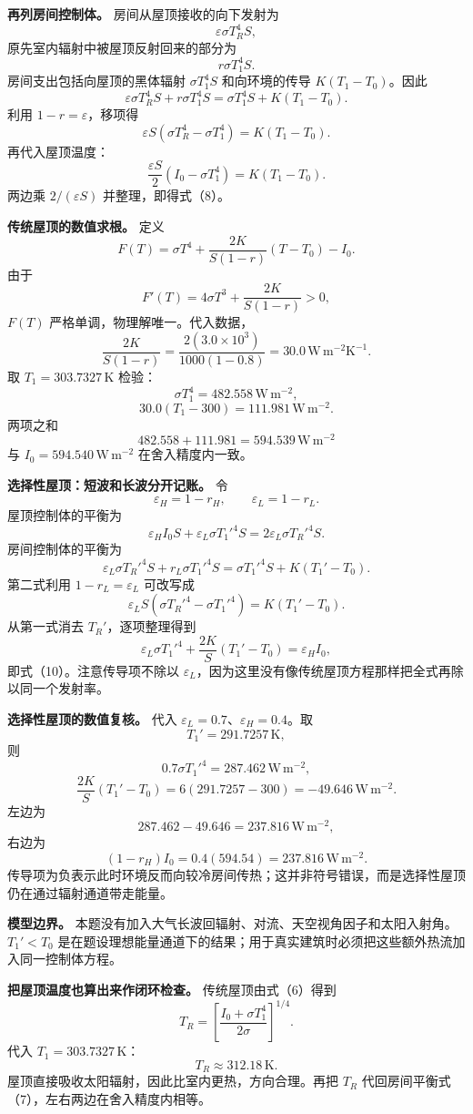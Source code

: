 \documentclass[12pt,a4paper,UTF8]{ctexart}
\begin{document}
\textbf{再列房间控制体。} 房间从屋顶接收的向下发射为 \[
\varepsilon\sigma T_R^4S,
\] 原先室内辐射中被屋顶反射回来的部分为 \[
r\sigma T_1^4S.
\] 房间支出包括向屋顶的黑体辐射 \(\sigma T_1^4S\) 和向环境的传导
\(K(T_1-T_0)\)。因此 \[
\varepsilon\sigma T_R^4S
+r\sigma T_1^4S
=\sigma T_1^4S+K(T_1-T_0).
\] 利用 \(1-r=\varepsilon\)，移项得 \[
\varepsilon S\left(\sigma T_R^4-\sigma T_1^4\right)
=K(T_1-T_0).
\] 再代入屋顶温度： \[
\frac{\varepsilon S}{2}
\left(I_0-\sigma T_1^4\right)
=K(T_1-T_0).
\] 两边乘 \(2/(\varepsilon S)\) 并整理，即得式（8）。

\textbf{传统屋顶的数值求根。} 定义 \[
F(T)=\sigma T^4+
\frac{2K}{S(1-r)}(T-T_0)-I_0.
\] 由于 \[
F'(T)=4\sigma T^3+\frac{2K}{S(1-r)}>0,
\] \(F(T)\) 严格单调，物理解唯一。代入数据， \[
\frac{2K}{S(1-r)}
=\frac{2(3.0\times10^3)}
{1000(1-0.8)}
=30.0\,\mathrm{W\,m^{-2}K^{-1}}.
\] 取 \(T_1=303.7327\,\mathrm K\) 检验： \[
\sigma T_1^4=482.558\,\mathrm{W\,m^{-2}},
\] \[
30.0(T_1-300)
=111.981\,\mathrm{W\,m^{-2}}.
\] 两项之和 \[
482.558+111.981
=594.539\,\mathrm{W\,m^{-2}}
\] 与 \(I_0=594.540\,\mathrm{W\,m^{-2}}\) 在舍入精度内一致。

\textbf{选择性屋顶：短波和长波分开记账。} 令 \[
\varepsilon_H=1-r_H,\qquad
\varepsilon_L=1-r_L.
\] 屋顶控制体的平衡为 \[
\varepsilon_HI_0S
+\varepsilon_L\sigma T_1'^4S
=2\varepsilon_L\sigma T_R'^4S.
\] 房间控制体的平衡为 \[
\varepsilon_L\sigma T_R'^4S
+r_L\sigma T_1'^4S
=\sigma T_1'^4S+K(T_1'-T_0).
\] 第二式利用 \(1-r_L=\varepsilon_L\) 可改写成 \[
\varepsilon_LS
\left(\sigma T_R'^4-\sigma T_1'^4\right)
=K(T_1'-T_0).
\] 从第一式消去 \(T_R'\)，逐项整理得到 \[
\varepsilon_L\sigma T_1'^4
+\frac{2K}{S}(T_1'-T_0)
=\varepsilon_HI_0,
\] 即式（10）。注意传导项不除以
\(\varepsilon_L\)，因为这里没有像传统屋顶方程那样把全式再除以同一个发射率。

\textbf{选择性屋顶的数值复核。} 代入
\(\varepsilon_L=0.7\)、\(\varepsilon_H=0.4\)。取 \[
T_1'=291.7257\,\mathrm K,
\] 则 \[
0.7\sigma T_1'^4
=287.462\,\mathrm{W\,m^{-2}},
\] \[
\frac{2K}{S}(T_1'-T_0)
=6(291.7257-300)
=-49.646\,\mathrm{W\,m^{-2}}.
\] 左边为 \[
287.462-49.646
=237.816\,\mathrm{W\,m^{-2}},
\] 右边为 \[
(1-r_H)I_0=0.4(594.54)
=237.816\,\mathrm{W\,m^{-2}}.
\]
传导项为负表示此时环境反而向较冷房间传热；这并非符号错误，而是选择性屋顶仍在通过辐射通道带走能量。

\textbf{模型边界。}
本题没有加入大气长波回辐射、对流、天空视角因子和太阳入射角。\(T_1'<T_0\)
是在题设理想能量通道下的结果；用于真实建筑时必须把这些额外热流加入同一控制体方程。

\textbf{把屋顶温度也算出来作闭环检查。} 传统屋顶由式（6）得到 \[
T_R=
\left[
\frac{I_0+\sigma T_1^4}{2\sigma}
\right]^{1/4}.
\] 代入 \(T_1=303.7327\,\mathrm K\)： \[
T_R\approx312.18\,\mathrm K.
\] 屋顶直接吸收太阳辐射，因此比室内更热，方向合理。再把 \(T_R\)
代回房间平衡式（7），左右两边在舍入精度内相等。
\end{document}
